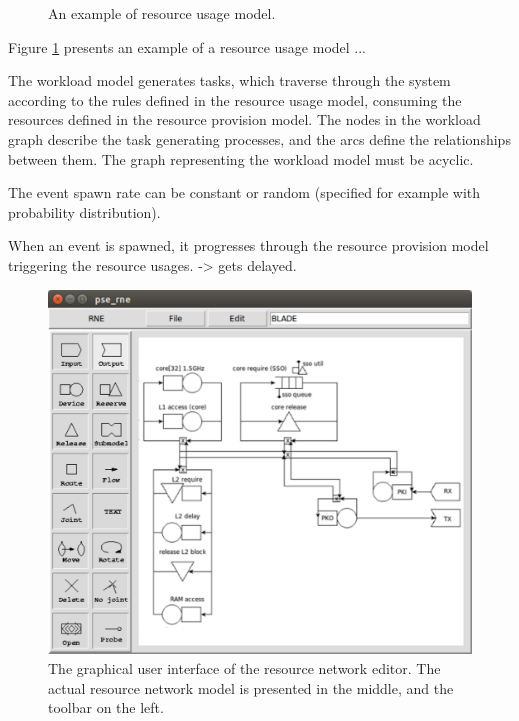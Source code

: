 \begin{figure}[]
  \begin{center}
    \caption{An example of resource usage model.}
    \label{fig:resource-usage-model}
  \end{center}
\end{figure}

Figure \ref{fig:resource-usage-model} presents an example of a resource usage model ...

The workload model generates tasks, which traverse through the system according to the rules defined in the resource usage model, consuming the resources defined in the resource provision model. The nodes in the workload graph describe the task generating processes, and the arcs define the relationships between them. The graph representing the workload model must be acyclic.

The event spawn rate can be constant or random (specified for example with probability distribution).

When an event is spawned, it progresses through the resource provision model triggering the resource usages. -> gets delayed.

\begin{figure}[]
  \begin{center}
    \includegraphics[width=\textwidth]{images/rne-example.pdf}
    \caption{The graphical user interface of the resource network editor. The actual resource network model is presented in the middle, and the toolbar on the left.}
    \label{fig:rne-example}
  \end{center}
\end{figure}

